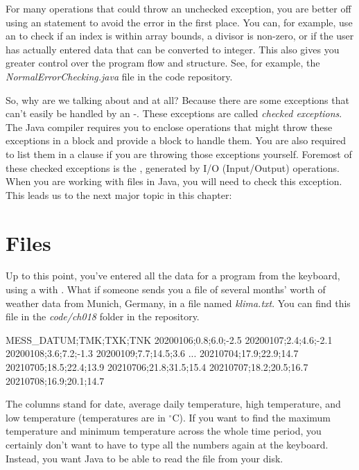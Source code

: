 For many operations that could throw an unchecked exception, you are better off using an  statement to avoid the error in the first place. You can, for example, use an  to check if an index is within array bounds, a divisor is non-zero, or if the user has actually entered data that can be converted to integer. This also gives you greater control over the program flow and structure. See, for example, the {\it NormalErrorChecking.java} file in the code repository.


So, why are we talking about  and  at all? Because there are some exceptions that can't easily be handled by an -. These exceptions are called {\em checked exceptions}. The Java compiler requires you to enclose operations that might throw these exceptions in a  block and provide a  block to handle them. You are also required to list them in a  clause if you are throwing those exceptions yourself. Foremost of these checked exceptions is the , generated by I/O (Input/Output) operations. When you are working with files in Java, you will need to check this exception. This leads us to the next major topic in this chapter:

\section{Files}

Up to this point, you've entered all the data for a program from the keyboard, using a  with .  What if someone sends you a file of several months' worth of weather data from Munich, Germany, in a file named {\em klima.txt}. You can find this file in the {\em code/ch018} folder in the repository\footnotemark.


\begin{stdout}
MESS_DATUM;TMK;TXK;TNK
20200106;0.8;6.0;-2.5
20200107;2.4;4.6;-2.1
20200108;3.6;7.2;-1.3
20200109;7.7;14.5;3.6
...
20210704;17.9;22.9;14.7
20210705;18.5;22.4;13.9
20210706;21.8;31.5;15.4
20210707;18.2;20.5;16.7
20210708;16.9;20.1;14.7
\end{stdout}

The columns stand for date, average daily temperature, high temperature, and low temperature (temperatures are in $^\circ$C).
If you want to find the maximum temperature and minimum temperature across the whole time period, you certainly don't want to have to type all the numbers again at the keyboard. Instead, you want Java to be able to read the file from your disk.

